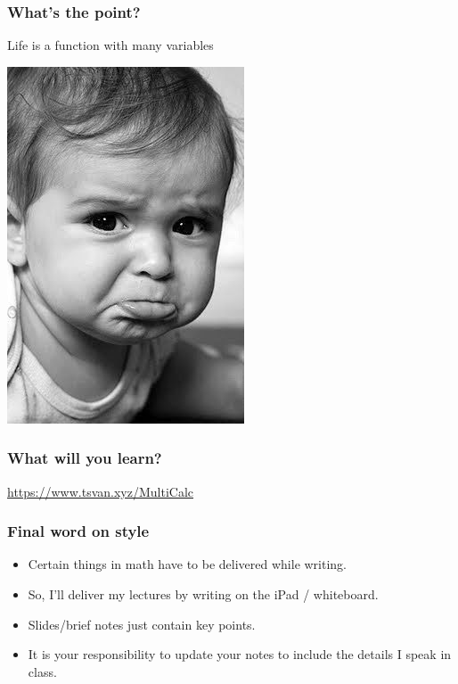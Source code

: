 \documentclass[aspectratio=169]{beamer}
\begin{document}
\begin{frame}
    \frametitle{What's the point?}
    Life is a function with many variables \pause

    \centering
    \includegraphics[height=0.5\textheight]{sad}
\end{frame}

\begin{frame}
    \frametitle{What will you learn?}
    \url{https://www.tsvan.xyz/MultiCalc}
\end{frame}

\begin{frame}
    \frametitle{Final word on style}
    \begin{itemize}
        \item Certain things in math have to be delivered while writing.
        \item So, I'll deliver my lectures by writing on the iPad / whiteboard.
        \item Slides/brief notes just contain key points.
        \item It is your responsibility to update your notes to include the details I speak in class.
    \end{itemize}

\end{frame}
\end{document}
